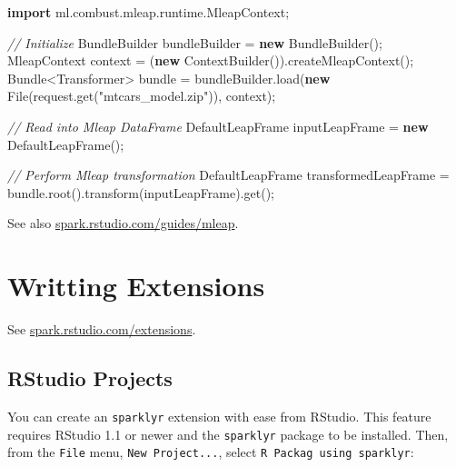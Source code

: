 \documentclass[]{book}
\newenvironment{Shaded}{\begin{snugshade}}{\end{snugshade}}
\newcommand{\BuiltInTok}[1]{#1}
\newcommand{\CommentTok}[1]{\textcolor[rgb]{0.56,0.35,0.01}{\textit{#1}}}
\newcommand{\FunctionTok}[1]{\textcolor[rgb]{0.00,0.00,0.00}{#1}}
\newcommand{\ImportTok}[1]{#1}
\newcommand{\KeywordTok}[1]{\textcolor[rgb]{0.13,0.29,0.53}{\textbf{#1}}}
\newcommand{\NormalTok}[1]{#1}
\newcommand{\StringTok}[1]{\textcolor[rgb]{0.31,0.60,0.02}{#1}}
\theoremstyle{definition}
\theoremstyle{definition}
\theoremstyle{definition}
\theoremstyle{remark}
\begin{document}
\begin{Shaded}
\begin{Highlighting}[]
\KeywordTok{import}\ImportTok{ ml.combust.mleap.runtime.MleapContext;}

\CommentTok{// Initialize}
\NormalTok{BundleBuilder bundleBuilder = }\KeywordTok{new} \FunctionTok{BundleBuilder}\NormalTok{();}
\NormalTok{MleapContext context = (}\KeywordTok{new} \FunctionTok{ContextBuilder}\NormalTok{()).}\FunctionTok{createMleapContext}\NormalTok{();}
\NormalTok{Bundle<}\BuiltInTok{Transformer}\NormalTok{> bundle = bundleBuilder.}\FunctionTok{load}\NormalTok{(}\KeywordTok{new} \BuiltInTok{File}\NormalTok{(request.}\FunctionTok{get}\NormalTok{(}\StringTok{"mtcars_model.zip"}\NormalTok{)), context);}

\CommentTok{// Read into Mleap DataFrame}
\NormalTok{DefaultLeapFrame inputLeapFrame = }\KeywordTok{new} \FunctionTok{DefaultLeapFrame}\NormalTok{();}

\CommentTok{// Perform Mleap transformation}
\NormalTok{DefaultLeapFrame transformedLeapFrame = bundle.}\FunctionTok{root}\NormalTok{().}\FunctionTok{transform}\NormalTok{(inputLeapFrame).}\FunctionTok{get}\NormalTok{();}
\end{Highlighting}
\end{Shaded}

See also
\href{http://spark.rstudio.com/guides/mleap/}{spark.rstudio.com/guides/mleap}.

\hypertarget{writting-extensions}{%
\section{Writting Extensions}\label{writting-extensions}}

See
\href{http://spark.rstudio.com/extensions/}{spark.rstudio.com/extensions}.

\hypertarget{rstudio-projects}{%
\subsection{RStudio Projects}\label{rstudio-projects}}

You can create an \texttt{sparklyr} extension with ease from RStudio.
This feature requires RStudio 1.1 or newer and the \texttt{sparklyr}
package to be installed. Then, from the \texttt{File} menu,
\texttt{New\ Project...}, select \texttt{R\ Packag\ using\ sparklyr}:
\end{document}
